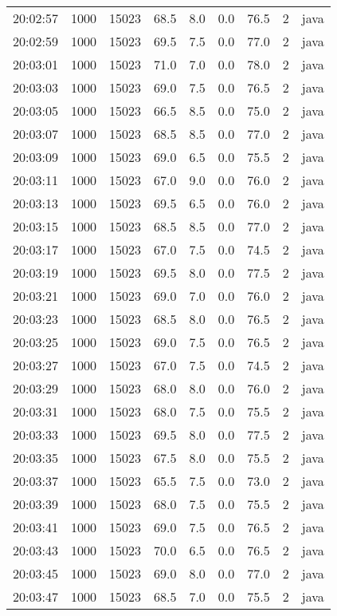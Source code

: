 \documentclass[11pt]{article}
\begin{document}
\begin{table}[htbp]
\begin{tabular}{rrrrrrrrl}
20:02:57 & 1000 & 15023 & 68.5 & 8.0 & 0.0 & 76.5 & 2 & java\\
20:02:59 & 1000 & 15023 & 69.5 & 7.5 & 0.0 & 77.0 & 2 & java\\
20:03:01 & 1000 & 15023 & 71.0 & 7.0 & 0.0 & 78.0 & 2 & java\\
20:03:03 & 1000 & 15023 & 69.0 & 7.5 & 0.0 & 76.5 & 2 & java\\
20:03:05 & 1000 & 15023 & 66.5 & 8.5 & 0.0 & 75.0 & 2 & java\\
20:03:07 & 1000 & 15023 & 68.5 & 8.5 & 0.0 & 77.0 & 2 & java\\
20:03:09 & 1000 & 15023 & 69.0 & 6.5 & 0.0 & 75.5 & 2 & java\\
20:03:11 & 1000 & 15023 & 67.0 & 9.0 & 0.0 & 76.0 & 2 & java\\
20:03:13 & 1000 & 15023 & 69.5 & 6.5 & 0.0 & 76.0 & 2 & java\\
20:03:15 & 1000 & 15023 & 68.5 & 8.5 & 0.0 & 77.0 & 2 & java\\
20:03:17 & 1000 & 15023 & 67.0 & 7.5 & 0.0 & 74.5 & 2 & java\\
20:03:19 & 1000 & 15023 & 69.5 & 8.0 & 0.0 & 77.5 & 2 & java\\
20:03:21 & 1000 & 15023 & 69.0 & 7.0 & 0.0 & 76.0 & 2 & java\\
20:03:23 & 1000 & 15023 & 68.5 & 8.0 & 0.0 & 76.5 & 2 & java\\
20:03:25 & 1000 & 15023 & 69.0 & 7.5 & 0.0 & 76.5 & 2 & java\\
20:03:27 & 1000 & 15023 & 67.0 & 7.5 & 0.0 & 74.5 & 2 & java\\
20:03:29 & 1000 & 15023 & 68.0 & 8.0 & 0.0 & 76.0 & 2 & java\\
20:03:31 & 1000 & 15023 & 68.0 & 7.5 & 0.0 & 75.5 & 2 & java\\
20:03:33 & 1000 & 15023 & 69.5 & 8.0 & 0.0 & 77.5 & 2 & java\\
20:03:35 & 1000 & 15023 & 67.5 & 8.0 & 0.0 & 75.5 & 2 & java\\
20:03:37 & 1000 & 15023 & 65.5 & 7.5 & 0.0 & 73.0 & 2 & java\\
20:03:39 & 1000 & 15023 & 68.0 & 7.5 & 0.0 & 75.5 & 2 & java\\
20:03:41 & 1000 & 15023 & 69.0 & 7.5 & 0.0 & 76.5 & 2 & java\\
20:03:43 & 1000 & 15023 & 70.0 & 6.5 & 0.0 & 76.5 & 2 & java\\
20:03:45 & 1000 & 15023 & 69.0 & 8.0 & 0.0 & 77.0 & 2 & java\\
20:03:47 & 1000 & 15023 & 68.5 & 7.0 & 0.0 & 75.5 & 2 & java\\

\end{tabular}
\end{table}
\end{document}
